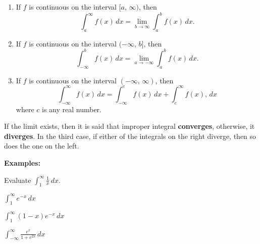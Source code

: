 \documentclass[addpoints, 12pt]{exam}
\begin{document}
\begin{tcolorbox}[title= DEFINITION OF IMPROPER INTEGRALS WITH INFINITE BOUNDS,black,sharp corners,colback=white,colbacktitle=white,coltitle=black]

    \begin{enumerate}
        \item If $f$ is continuous on the interval $[a,\,\infty)$, then 
        \[\int_a^\infty f(x)\,dx=\lim_{b\to\infty}\int_a^b f(x)\,dx.\]
        \item If $f$ is continuous on the interval $(-\infty,\,b]$, then 
        \[\int_{-\infty}^b f(x)\,dx=\lim_{a\to-\infty}\int_a^b f(x)\,dx.\]
        \item If $f$ is continuous on the interval $(-\infty,\,\infty)$, then 
        \[\int_{-\infty}^\infty f(x)\,dx=\int_{-\infty}^c f(x)\,dx + \int_c^{\infty} f(x),\,dx\]
        where $c$ is any real number.
    \end{enumerate}
    
    If the limit exists, then it is said that improper integral \textbf{converges}, otherwise, it \textbf{diverges}. In the third case, if either of the integrals on the right diverge, then so does the one on the left.

\end{tcolorbox}

\textbf{Examples:}
\begin{questions}
    \question Evaluate $\displaystyle\int_1^\infty \frac{1}{x}\,dx$.
    
    \newpage
    
    \begin{minipage}{.45\linewidth}
        \question $\displaystyle\int_1^\infty e^{-x}\,dx$
    \end{minipage}
    \hfill
    \begin{minipage}{.45\linewidth}
        \question $\displaystyle\int_1^\infty (1-x)e^{-x} \,dx$
    \end{minipage}

    
    
    \question $\displaystyle\int_{-\infty}^\infty\frac{e^x}{1+e^{2x}}\,dx$


\end{questions}

\newpage
\end{document}
